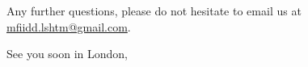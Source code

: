 \documentclass[paper=a4, 11pt]{scrlttr2}
\begin{document}
\begin{letter}{}
\begin{enumerate}
\end{enumerate}
Any further questions, please do not hesitate to email us at \href{mailto:mfiidd.lshtm@gmail.com}{mfiidd.lshtm@gmail.com}.

\closing{See you soon in London,}
\end{letter}
\end{document}
